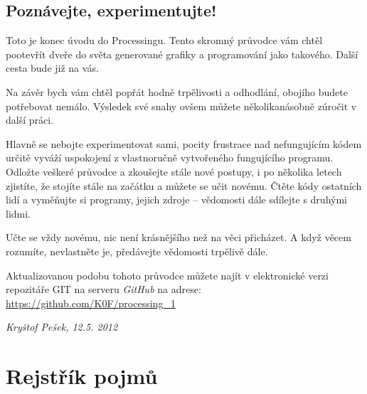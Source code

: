 \documentclass[10pt]{book}
\begin{document}
\section{Poznávejte, experimentujte!}

Toto je konec úvodu do Processingu. Tento skromný průvodce vám chtěl pootevřít dveře do světa generované grafiky a programování jako takového. Další cesta bude již na vás.

Na závěr bych vám chtěl popřát hodně trpělivosti a odhodlání, obojího budete potřebovat nemálo. Výsledek své snahy ovšem můžete několikanásobně zúročit v další práci.

Hlavně se nebojte experimentovat sami, pocity frustrace nad nefungujícím kódem určitě vyváží uspokojení z vlastnoručně vytvořeného fungujícího programu. Odložte veškeré průvodce a zkoušejte stále nové postupy, i po několika letech zjistíte, že stojíte stále na začátku a můžete se učit novému. Čtěte kódy ostatních lidí a vyměňujte si programy, jejich zdroje -- vědomosti dále sdílejte s druhými lidmi.

Učte se vždy novému, nic není krásnějšího než na věci přicházet. A když věcem rozumíte, nevlastněte je, předávejte vědomosti trpělivě dále.

\vfill

Aktualizovanou podobu tohoto průvodce můžete najít v elektronické verzi repozitáře GIT na serveru {\em GitHub} na adrese:\\
\url{https://github.com/K0F/processing\_1}

\begin{flushright}
{\em Kryštof Pešek, 12.5. 2012}
\end{flushright}

\chapter{Rejstřík pojmů}
\printglossaries

\printindex


\end{document}
